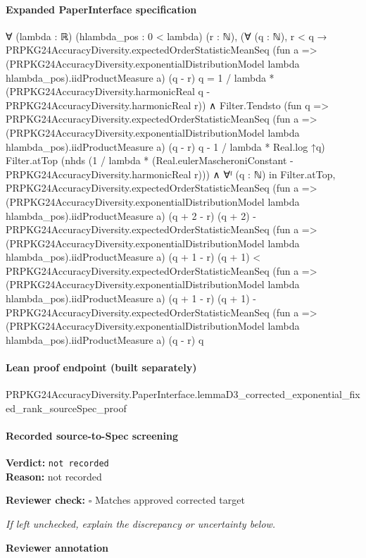 \documentclass[10pt]{article}
\newcommand{\reviewerbox}{%
  \par\noindent\fbox{\parbox{0.96\linewidth}{\rule{0pt}{0.38in}}}\par
}
\newcommand{\reviewmatch}[1]{%
  \par\noindent\textbf{Reviewer check:} $\square$\; #1\par
  \noindent\emph{If left unchecked, explain the discrepancy or uncertainty below.}\par
}
\begin{document}
\paragraph{Expanded PaperInterface specification}
\begin{ReviewVerbatim}
∀ (lambda : ℝ) (hlambda_pos : 0 < lambda) (r : ℕ),
  (∀ (q : ℕ),
      r < q →
        PRPKG24AccuracyDiversity.expectedOrderStatisticMeanSeq
            (fun a => (PRPKG24AccuracyDiversity.exponentialDistributionModel lambda hlambda_pos).iidProductMeasure a)
            (q - r) q =
          1 / lambda * (PRPKG24AccuracyDiversity.harmonicReal q - PRPKG24AccuracyDiversity.harmonicReal r)) ∧
    Filter.Tendsto
        (fun q =>
          PRPKG24AccuracyDiversity.expectedOrderStatisticMeanSeq
              (fun a => (PRPKG24AccuracyDiversity.exponentialDistributionModel lambda hlambda_pos).iidProductMeasure a)
              (q - r) q -
            1 / lambda * Real.log ↑q)
        Filter.atTop (nhds (1 / lambda * (Real.eulerMascheroniConstant - PRPKG24AccuracyDiversity.harmonicReal r))) ∧
      ∀ᶠ (q : ℕ) in Filter.atTop,
        PRPKG24AccuracyDiversity.expectedOrderStatisticMeanSeq
              (fun a => (PRPKG24AccuracyDiversity.exponentialDistributionModel lambda hlambda_pos).iidProductMeasure a)
              (q + 2 - r) (q + 2) -
            PRPKG24AccuracyDiversity.expectedOrderStatisticMeanSeq
              (fun a => (PRPKG24AccuracyDiversity.exponentialDistributionModel lambda hlambda_pos).iidProductMeasure a)
              (q + 1 - r) (q + 1) <
          PRPKG24AccuracyDiversity.expectedOrderStatisticMeanSeq
              (fun a => (PRPKG24AccuracyDiversity.exponentialDistributionModel lambda hlambda_pos).iidProductMeasure a)
              (q + 1 - r) (q + 1) -
            PRPKG24AccuracyDiversity.expectedOrderStatisticMeanSeq
              (fun a => (PRPKG24AccuracyDiversity.exponentialDistributionModel lambda hlambda_pos).iidProductMeasure a)
              (q - r) q
\end{ReviewVerbatim}

\paragraph{Lean proof endpoint (built separately)}\begin{ReviewVerbatim}
PRPKG24AccuracyDiversity.PaperInterface.lemmaD3_corrected_exponential_fixed_rank_sourceSpec_proof
\end{ReviewVerbatim}

\paragraph{Recorded source-to-Spec screening}
\textbf{Verdict:} \texttt{not recorded}
\\
\textbf{Reason:} not recorded
\reviewmatch{Matches approved corrected target}
\noindent\textbf{Reviewer annotation}\par
\reviewerbox
\clearpage
\hypertarget{source-claim-49105a2b2538ba9d}{}
\end{document}

